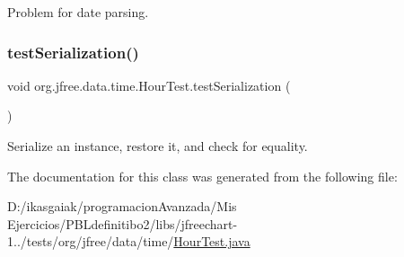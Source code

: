 Problem for date parsing. \mbox{\label{classorg_1_1jfree_1_1data_1_1time_1_1_hour_test_ab372c442437168b344ec7a4e92a8cc78}} 
\subsubsection{\texorpdfstring{test\+Serialization()}{testSerialization()}}
{\footnotesize\ttfamily void org.\+jfree.\+data.\+time.\+Hour\+Test.\+test\+Serialization (\begin{DoxyParamCaption}{ }\end{DoxyParamCaption})}

Serialize an instance, restore it, and check for equality. 

The documentation for this class was generated from the following file\+:\begin{DoxyCompactItemize}
\item 
D\+:/ikasgaiak/programacion\+Avanzada/\+Mis Ejercicios/\+P\+B\+Ldefinitibo2/libs/jfreechart-\/1../tests/org/jfree/data/time/\mbox{\hyperlink{_hour_test_8java}{Hour\+Test.\+java}}\end{DoxyCompactItemize}
